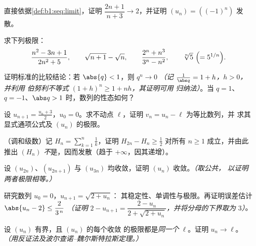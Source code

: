 \begin{exercise}[$\star$]\label{exo:b1:seq:1}
直接依据\cref{def:b1:seq:limit}，证明
$\dfrac{2n+1}{n+3} \to 2$，并证明 $(u_n) = ((-1)^n)$ 发散。
\end{exercise}

\begin{exercise}[$\star$]\label{exo:b1:seq:2}
求下列极限：
\[
\frac{n^2 - 3n + 1}{2n^2 + 5},
\qquad
\sqrt{n+1} - \sqrt n,
\qquad
\frac{2^n + n^3}{3^n - n^2},
\qquad
\sqrt[n]{5}\ \Bigl(= 5^{1/n}\Bigr).
\]
\end{exercise}

\begin{exercise}[$\star$]\label{exo:b1:seq:3}
证明标准的比较结论：若 $\abs{q} < 1$，则 $q^n \to 0$
\emph{（记 $\frac{1}{\abs q} = 1 + h$，$h > 0$，并利用
伯努利不等式 $(1+h)^n \geq 1 + nh$，其证明可用
归纳法）}。当 $q = 1$、$q = -1$、$\abs q >
1$ 时，数列的性态如何？
\end{exercise}

\begin{exercise}[$\star$]\label{exo:b1:seq:4}
设 $u_{n+1} = \frac{u_n + 3}{2}$，$u_0 = 0$。求不动点
$\ell$，证明 $v_n = u_n - \ell$ 为等比数列，并
求其显式通项公式及 $(u_n)$ 的极限。
\end{exercise}

\begin{exercise}[$\star\star$]\label{exo:b1:seq:5}
（调和级数）记 $H_n = \sum_{k=1}^{n} \frac 1k$，证明
$H_{2n} - H_n \geq \frac12$ 对所有 $n \geq 1$ 成立，并由此推出
$(H_n)$ \emph{不}是，因而发散（趋于
$+\infty$，因其递增）。
\end{exercise}

\begin{exercise}[$\star\star$]\label{exo:b1:seq:6}
设 $(u_{2n})$、$(u_{2n+1})$ 与 $(u_{3n})$ 均收敛，证明
$(u_n)$ 收敛。\emph{（取公共，
以证明两者极限相等。）}
\end{exercise}

\begin{exercise}[$\star\star$]\label{exo:b1:seq:7}
研究数列 $u_0 = 0$，$u_{n+1} = \sqrt{2 + u_n}$：
其稳定性、单调性与极限。再证明误差估计
$\abs{u_n - 2} \leq \dfrac{2}{3^{\,n}}$ \emph{（证明 $2 - u_{n+1} =
\dfrac{2 - u_n}{2 + \sqrt{2 + u_n}}$，并将分母的下界取为
$3$）}。
\end{exercise}

\begin{exercise}[$\star\star$]\label{exo:b1:seq:8}
设 $(u_n)$ 有界，且 $(u_n)$ 的每个收敛
的极限都是\emph{同一个} $\ell$。证明 $u_n \to \ell$。
\emph{（用反证法及波尔查诺--魏尔斯特拉斯定理。）}
\end{exercise}

